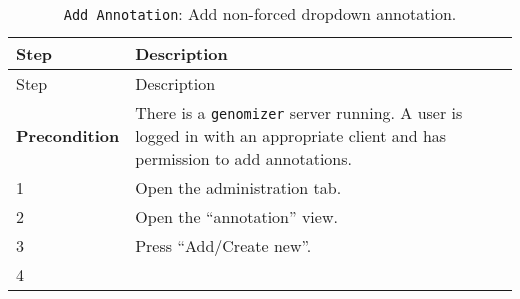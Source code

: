 \begin{longtable}[c]{@{}ll@{}}
\caption{\texttt{Add\ Annotation}: Add non-forced dropdown
annotation.}\tabularnewline
\toprule
\begin{minipage}[b]{0.31\columnwidth}\raggedright\strut
Step
\strut\end{minipage} &
\begin{minipage}[b]{0.63\columnwidth}\raggedright\strut
Description
\strut\end{minipage}\tabularnewline
\midrule
\endfirsthead
\toprule
\begin{minipage}[b]{0.31\columnwidth}\raggedright\strut
Step
\strut\end{minipage} &
\begin{minipage}[b]{0.63\columnwidth}\raggedright\strut
Description
\strut\end{minipage}\tabularnewline
\midrule
\endhead
\begin{minipage}[t]{0.31\columnwidth}\raggedright\strut
\textbf{Precondition}
\strut\end{minipage} &
\begin{minipage}[t]{0.63\columnwidth}\raggedright\strut
There is a \texttt{genomizer} server running. A user is logged in with
an appropriate client and has permission to add annotations.
\strut\end{minipage}\tabularnewline
\begin{minipage}[t]{0.31\columnwidth}\raggedright\strut
1
\strut\end{minipage} &
\begin{minipage}[t]{0.63\columnwidth}\raggedright\strut
Open the administration tab.
\strut\end{minipage}\tabularnewline
\begin{minipage}[t]{0.31\columnwidth}\raggedright\strut
2
\strut\end{minipage} &
\begin{minipage}[t]{0.63\columnwidth}\raggedright\strut
Open the ``annotation'' view.
\strut\end{minipage}\tabularnewline
\begin{minipage}[t]{0.31\columnwidth}\raggedright\strut
3
\strut\end{minipage} &
\begin{minipage}[t]{0.63\columnwidth}\raggedright\strut
Press ``Add/Create new''.
\strut\end{minipage}\tabularnewline
\begin{minipage}[t]{0.31\columnwidth}\raggedright\strut
4
\strut\end{minipage} &

\end{longtable}
